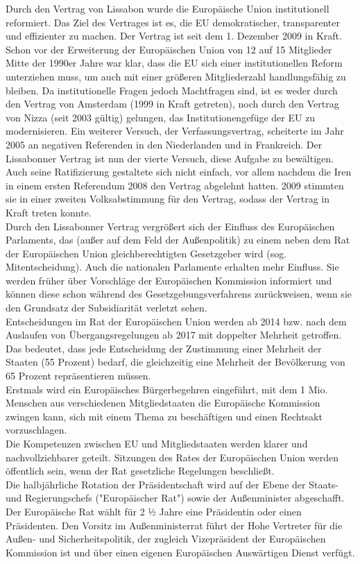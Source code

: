 \documentclass[letterpaper, 12pt]{article}
\begin{document}
Durch den Vertrag von Lissabon wurde die Europäische Union institutionell reformiert. Das Ziel des Vertrages ist es, die EU demokratischer, transparenter und effizienter zu machen. Der Vertrag ist seit dem 1. Dezember 2009 in Kraft. \\
Schon vor der Erweiterung der Europäischen Union von 12 auf 15 Mitglieder Mitte der 1990er Jahre war klar, dass die EU sich einer institutionellen Reform unterziehen muss, um auch mit einer größeren Mitgliederzahl handlungsfähig zu bleiben. Da institutionelle Fragen jedoch Machtfragen sind, ist es weder durch den Vertrag von Amsterdam (1999 in Kraft getreten), noch durch den Vertrag von Nizza (seit 2003 gültig) gelungen, das Institutionengefüge der EU zu modernisieren. Ein weiterer Versuch, der Verfassungsvertrag, scheiterte im Jahr 2005 an negativen Referenden in den Niederlanden und in Frankreich. Der Lissabonner Vertrag ist nun der vierte Versuch, diese Aufgabe zu bewältigen. Auch seine Ratifizierung gestaltete sich nicht einfach, vor allem nachdem die Iren in einem ersten Referendum 2008 den Vertrag abgelehnt hatten. 2009 stimmten sie in einer zweiten Volksabstimmung für den Vertrag, sodass der Vertrag in Kraft treten konnte. \\
Durch den Lissabonner Vertrag vergrößert sich der Einfluss des Europäischen Parlaments, das (außer auf dem Feld der Außenpolitik) zu einem neben dem Rat der Europäischen Union gleichberechtigten Gesetzgeber wird (sog. Mitentscheidung). Auch die nationalen Parlamente erhalten mehr Einfluss. Sie werden früher über Vorschläge der Europäischen Kommission informiert und können diese schon während des Gesetzgebungsverfahrens zurückweisen, wenn sie den Grundsatz der Subsidiarität verletzt sehen. \\
Entscheidungen im Rat der Europäischen Union werden ab 2014 bzw. nach dem Auslaufen von Übergangsregelungen ab 2017 mit doppelter Mehrheit getroffen. Das bedeutet, dass jede Entscheidung der Zustimmung einer Mehrheit der Staaten (55 Prozent) bedarf, die gleichzeitig eine Mehrheit der Bevölkerung von 65 Prozent repräsentieren müssen. \\
Erstmals wird ein Europäisches Bürgerbegehren eingeführt, mit dem 1 Mio. Menschen aus verschiedenen Mitgliedstaaten die Europäische Kommission zwingen kann, sich mit einem Thema zu beschäftigen und einen Rechtsakt vorzuschlagen. \\
Die Kompetenzen zwischen EU und Mitgliedstaaten werden klarer und nachvollziehbarer geteilt. Sitzungen des Rates der Europäischen Union werden öffentlich sein, wenn der Rat gesetzliche Regelungen beschließt. \\
Die halbjährliche Rotation der Präsidentschaft wird auf der Ebene der Staats- und Regierungschefs ("Europäischer Rat") sowie der Außenminister abgeschafft. Der Europäische Rat wählt für 2 ½ Jahre eine Präsidentin oder einen Präsidenten. Den Vorsitz im Außenministerrat führt der Hohe Vertreter für die Außen- und Sicherheitspolitik, der zugleich Vizepräsident der Europäischen Kommission ist und über einen eigenen Europäischen Auswärtigen Dienst verfügt. 

\clearpage


\end{document}
